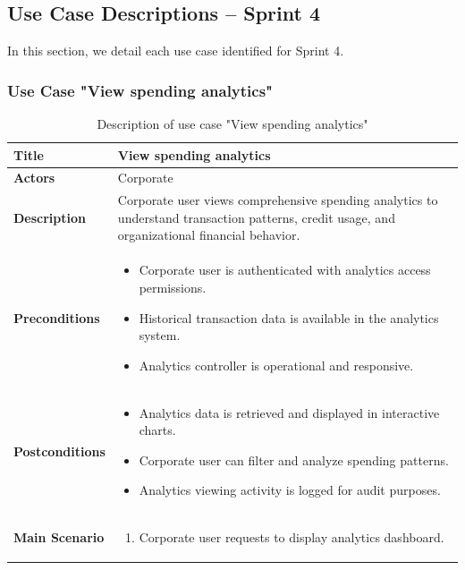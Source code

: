 \subsection{Use Case Descriptions – Sprint 4}

In this section, we detail each use case identified for Sprint 4.

\vspace{5cm}

\subsubsection{Use Case "View spending analytics"}
\begin{longtable}{|p{}|p{}|}
  \caption{Description of use case "View spending analytics"}
  \label{tab:uc_view_analytics} \\
  \hline
  \textbf{Title} & View spending analytics \\ \hline
  \textbf{Actors} & Corporate \\ \hline
  \textbf{Description} & Corporate user views comprehensive spending analytics to understand transaction patterns, credit usage, and organizational financial behavior. \\ \hline
  \textbf{Preconditions} & 
    \begin{itemize}[nosep,leftmargin=*]
      \item Corporate user is authenticated with analytics access permissions.
      \item Historical transaction data is available in the analytics system.
      \item Analytics controller is operational and responsive.
    \end{itemize} \\ \hline
  \textbf{Postconditions} & 
    \begin{itemize}[nosep,leftmargin=*]
      \item Analytics data is retrieved and displayed in interactive charts.
      \item Corporate user can filter and analyze spending patterns.
      \item Analytics viewing activity is logged for audit purposes.
    \end{itemize} \\ \hline
  \textbf{Main Scenario} &
    \begin{enumerate}[nosep,leftmargin=*]
      \item Corporate user requests to display analytics dashboard.

\end{enumerate}
\end{longtable}
